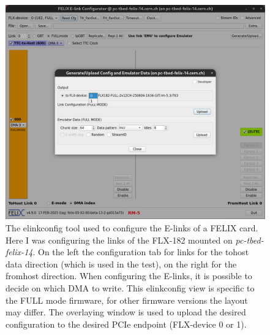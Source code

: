 \begin{figure}[htbp]
\centering
\includegraphics[width=\textwidth]{images/results/elinkconfig.png}
\caption[elinkconfig]{The elinkconfig tool used to configure the \acs{E-link}s of a \acs{FELIX} card. Here I was configuring the links of the FLX-182 mounted on \emph{pc-tbed-felix-14}. On the left the configuration tab for links for the tohost data direction (which is used in the test), on the right for the fromhost direction. When configuring the \acs{E-link}s, it is possible to decide on which \acs{DMA} to write. This elinkconfig view is specific to the FULL mode firmware, for other firmware versions the layout may differ.
The overlaying window is used to upload the desired configuration to the desired \acs{PCIe} endpoint (FLX-device 0 or 1).}
\label{fig:elinkconfig}
\end{figure}

